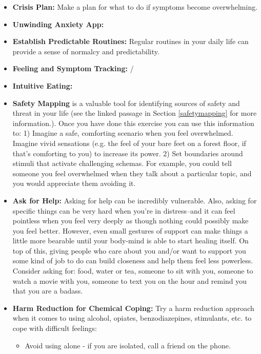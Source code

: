 \documentclass[12pt,letterpaper]{book}
\begin{document}
\begin{itemize}
\begin{itemize}
    \end{itemize}
    \item \textbf{Crisis Plan:} Make a plan for what to do if symptoms become overwhelming. 
    \item \textbf{Unwinding Anxiety App:} 
    \item \textbf{Establish Predictable Routines:} Regular routines in your daily life can provide a sense of normalcy and predictability. 
    \item \textbf{Feeling and Symptom Tracking:} /
    \item \textbf{Intuitive Eating:} 
    \item \textbf{Safety Mapping} is a valuable tool for identifying sources of safety and threat in your life (see the linked passage in Section \ref{safetymapping} for more information.). Once you have done this exercise you can use this information to: 1) Imagine a safe, comforting scenario when you feel overwhelmed. Imagine vivid sensations (e.g. the feel of your bare feet on a forest floor, if that's comforting to you) to increase its power. 2) Set boundaries around stimuli that activate challenging schemas. For example, you could tell someone you feel overwhelmed when they talk about a particular topic, and you would appreciate them avoiding it.
    \item \textbf{Ask for Help:} Asking for help can be incredibly vulnerable. Also, asking for specific things can be very hard when you're in distress–and it can feel pointless when you feel very deeply as though nothing could possibly make you feel better. However, even small gestures of support can make things a little more bearable until your body-mind is able to start healing itself. On top of this, giving people who care about you and/or want to support you some kind of job to do can build closeness and help them feel less powerless. Consider asking for: food, water or tea, someone to sit with you, someone to watch a movie with you, someone to text you on the hour and remind you that you are a badass.
    \item \textbf{Harm Reduction for Chemical Coping:} Try a harm reduction approach when it comes to using alcohol, opiates, benzodiazepines, stimulants, etc. to cope with difficult feelings:
    \begin{itemize}
        \item Avoid using alone - if you are isolated, call a friend on the phone.

\end{itemize}
\end{itemize}
\end{document}
